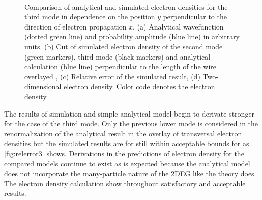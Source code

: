\begin{figure}[h]
  \begin{center}
 \qquad
    \\
    \qquad
    \caption{Comparison of analytical and simulated electron densities for the third mode in dependence on the position $y$ perpendicular to the direction of electron propagation $x$. (a) Analytical wavefunction (dotted green line) and probability amplitude (blue line) in arbitrary units. (b) Cut of simulated electron density of the second mode (green markers), third mode (black markers) and analytical calculation (blue line) perpendicular to the length of the wire overlayed , (c) Relative error of the simulated result, (d) Two-dimensional electron density. Color code denotes the electron density.}
  \end{center}
\end{figure}
The results of simulation and simple analytical model begin to derivate stronger for the case of the third mode. Only the previous lower mode is considered in the renormalization of the analytical result in the overlay of transversal electron densities but the simulated results are for still within acceptable bounds for as \cref{fig:relerror3} shows. Derivations in the predictions of electron density for the compared models continue to exist as is expected because the analytical model does not incorporate the many-particle nature of the 2DEG like the \gfnc{} theory does.
The electron density calculation show throughout satisfactory and acceptable results.\par
\FloatBarrier
